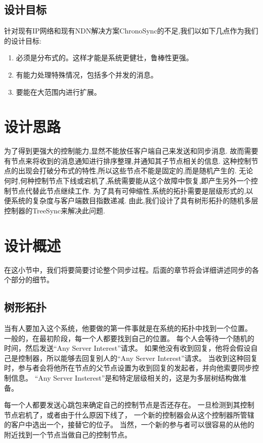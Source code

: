 \subsection{设计目标}
针对现有IP网络和现有NDN解决方案ChronoSync的不足,我们以如下几点作为我们的设计目标:
\begin{enumerate}
  \item 必须是分布式的。这样才能是系统更健壮，鲁棒性更强。
  \item 有能力处理特殊情况，包括多个并发的消息。
  \item 要能在大范围内进行扩展。
\end{enumerate}

\section{设计思路}
为了得到更强大的控制能力,显然不能放任客户端自己来发送和同步消息.
故而需要有节点来将收到的消息通知进行排序整理,并通知其子节点相关的信息.
这种控制节点的出现会打破分布式的特性,所以这些节点不能是固定的,而是随机产生的.
无论何时,何种控制节点下线或宕机了,系统需要能从这个故障中恢复,即产生另外一个控制节点代替此节点继续工作.
为了具有可伸缩性,系统的拓扑需要是层级形式的,以便系统的复杂度与客户端数目指数递减.
由此,我们设计了具有树形拓扑的随机多层控制器的TreeSync来解决此问题.

\section{设计概述}
在这小节中，我们将要简要讨论整个同步过程。后面的章节将会详细讲述同步的各个部分的细节。

\subsection{树形拓扑}

当有人要加入这个系统，他要做的第一件事就是在系统的拓扑中找到一个位置。
一般的，在最初阶段，每一个人都要找到自己的位置。
每个人会等待一个随机的时间，然后发送“Any Server Interest”请求。
如果他没有收到回复，他将会假设自己是控制器，所以能够去回复别人的“Any Server Interest”请求。
当收到这种回复时，参与者会将他所在节点的父节点设置为收到回复的发起者，并向他索要同步控制信息。
“Any Server Insterest”是和特定层级相关的，这是为多层树结构做准备。

每一个人都要发送心跳包来确定自己的控制节点是否还存在。
一旦检测到其控制节点宕机了，或者由于什么原因下线了，
一个新的控制器会从这个控制器所管辖的客户中选出一个，接替它的位子。
当然，一个新的参与者可以很容易的从他的附近找到一个节点当做自己的控制节点。

